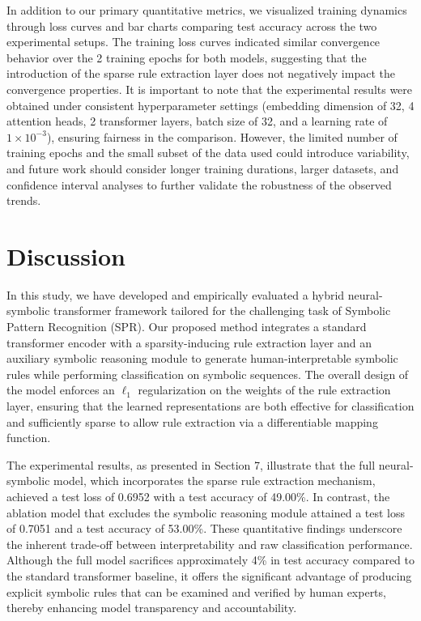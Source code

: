\documentclass{article}
\begin{document}
In addition to our primary quantitative metrics, we visualized training dynamics through loss curves and bar charts comparing test accuracy across the two experimental setups. The training loss curves indicated similar convergence behavior over the 2 training epochs for both models, suggesting that the introduction of the sparse rule extraction layer does not negatively impact the convergence properties. It is important to note that the experimental results were obtained under consistent hyperparameter settings (embedding dimension of 32, 4 attention heads, 2 transformer layers, batch size of 32, and a learning rate of \(1 \times 10^{-3}\)), ensuring fairness in the comparison. However, the limited number of training epochs and the small subset of the data used could introduce variability, and future work should consider longer training durations, larger datasets, and confidence interval analyses to further validate the robustness of the observed trends.

\section{Discussion}
In this study, we have developed and empirically evaluated a hybrid neural-symbolic transformer framework tailored for the challenging task of Symbolic Pattern Recognition (SPR). Our proposed method integrates a standard transformer encoder with a sparsity-inducing rule extraction layer and an auxiliary symbolic reasoning module to generate human-interpretable symbolic rules while performing classification on symbolic sequences. The overall design of the model enforces an \(\ell_1\) regularization on the weights of the rule extraction layer, ensuring that the learned representations are both effective for classification and sufficiently sparse to allow rule extraction via a differentiable mapping function.

The experimental results, as presented in Section 7, illustrate that the full neural-symbolic model, which incorporates the sparse rule extraction mechanism, achieved a test loss of 0.6952 with a test accuracy of 49.00\%. In contrast, the ablation model that excludes the symbolic reasoning module attained a test loss of 0.7051 and a test accuracy of 53.00\%. These quantitative findings underscore the inherent trade-off between interpretability and raw classification performance. Although the full model sacrifices approximately 4\% in test accuracy compared to the standard transformer baseline, it offers the significant advantage of producing explicit symbolic rules that can be examined and verified by human experts, thereby enhancing model transparency and accountability.
\end{document}
